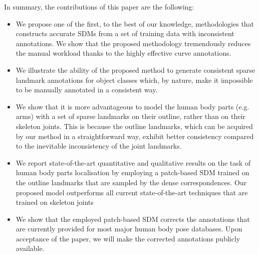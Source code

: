 

In summary, the contributions of this paper are the following:
\begin{itemize}

  \item We propose one of the first, to the best of our knowledge, methodologies that constructs accurate SDMs from a set of training data with inconsistent annotations. We show that the proposed methodology tremendously reduces the manual workload thanks to the highly effective curve annotations.

  \item We illustrate the ability of the proposed method to generate consistent sparse landmark annotations for object classes which, by nature, make it impossible to be manually annotated in a consistent way.

  \item We show that it is more advantageous to model the human body parts (e.g. arms) with a set of sparse landmarks on their outline, rather than on their skeleton joints. This is because the outline landmarks, which can be acquired by our method in a straightforward way, exhibit better consistency compared to the inevitable inconsistency of the joint landmarks.

  \item We report state-of-the-art quantitative and qualitative results on the task of human body parts localisation by employing a patch-based SDM trained on the outline landmarks that are sampled by the dense correspondences. Our proposed model outperforms all current state-of-the-art techniques that are trained on skeleton joints

  \item We show that the employed patch-based SDM corrects the annotations that are currently provided for most major human body pose databases. Upon acceptance of the paper, we will make the corrected annotations publicly available.

\end{itemize}







